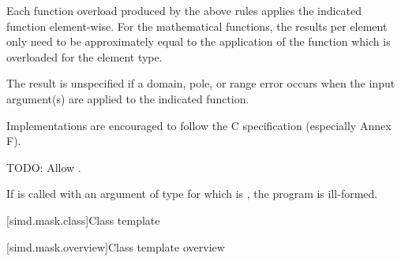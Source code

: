 \pnum
Each function overload produced by the above rules applies the indicated  function element-wise. For the mathematical functions, the results per element only need to be approximately equal to the application of the function which is overloaded for the element type.

\pnum
The result is unspecified if a domain, pole, or range error occurs when the input argument(s) are applied to the indicated  function.
\begin{note}Implementations are encouraged to follow the C specification (especially Annex F).\end{note}

\pnum
TODO: Allow .

\pnum
If  is called with an argument of type  for which  is , the program is ill-formed.

[simd.mask.class]{Class template }

[simd.mask.overview]{Class template  overview}

